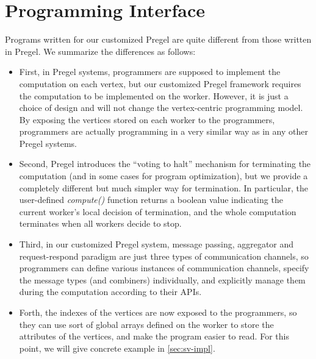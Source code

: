 \documentclass{sokendai_thesis} %
\begin{document}

\section{Programming Interface}

Programs written for our customized Pregel are quite different from those written in Pregel.
We summarize the differences as follows:
\begin{itemize}\setlength\itemsep{0em}
\item
 First, in Pregel systems, programmers are supposed to implement the computation on each vertex, but our customized Pregel framework requires the computation to be implemented on the worker.
 However, it is just a choice of design and will not change the vertex-centric programming model.
 By exposing the vertices stored on each worker to the programmers, programmers are actually programming in a very similar way as in any other Pregel systems.
\item
 Second, Pregel introduces the ``voting to halt'' mechanism for terminating the computation (and in some cases for program optimization), but we provide a completely different but much simpler way for termination.
 In particular, the user-defined \emph{compute()} function returns a boolean value indicating the current worker's local decision of termination, and the whole computation terminates when all workers decide to stop.
\item
 Third, in our customized Pregel system, message passing, aggregator and request-respond paradigm are just three types of communication channels, so programmers can define various instances of communication channels, specify the message types (and combiners) individually, and explicitly manage them during the computation according to their APIs.
\item
 Forth, the indexes of the vertices are now exposed to the programmers, so they can use sort of global arrays defined on the worker to store the attributes of the vertices, and make the program easier to read.
 For this point, we will give concrete example in \autoref{sec:sv-impl}.
\end{itemize}
\end{document}
